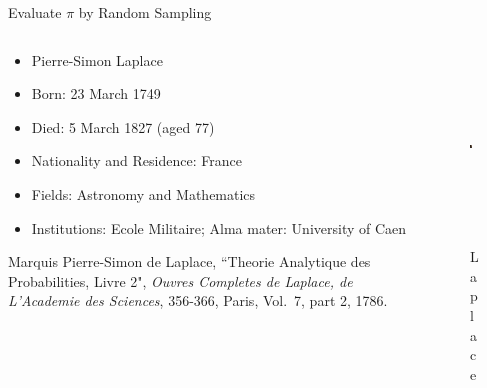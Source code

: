 \documentclass[xcolor=x11names,compress]{beamer}
\renewcommand{\(}{\begin{columns}}
\renewcommand{\)}{\end{columns}}
\newcommand{\<}[1]{\begin{column}{#1}}
\renewcommand{\>}{\end{column}}
\begin{document}
\begin{frame}{Evaluate $\pi$ by Random Sampling}

\begin{columns}
  \begin{column}{0.6\textwidth}
    \begin{itemize}
    \item Pierre-Simon Laplace 
    \item Born: 23 March 1749
    \item Died: 5 March 1827 (aged 77)
    \item Nationality and Residence: France
    \item Fields: Astronomy and Mathematics
    \item Institutions: Ecole Militaire; Alma mater: University of Caen
    \end{itemize}
    \vspace*{0.5 em}
    Marquis Pierre-Simon de Laplace, ``Theorie Analytique des Probabilities, Livre 2",  \textit{Ouvres Completes de Laplace, de L'Academie des Sciences}, 356-366, Paris, Vol.\ 7, part 2, 1786.
  \end{column}
  \begin{column}{0.4\textwidth}
  	\begin{figure}
  	\begin{center}
  		\includegraphics[height=2in,clip]{laplace}
  		\caption{Laplace}
	\end{center}
  	\end{figure}
  \end{column}
\end{columns}
\end{frame}
\end{document}
